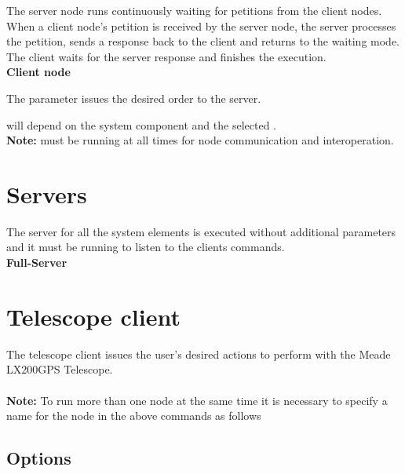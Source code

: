 \documentclass[a4paper,english]{article}
\begin{document}
The server node runs continuously waiting for petitions from the client nodes. When a client node's petition is received by the server node, the server processes the petition, sends a response back to the client and returns to the waiting mode. The client waits for the server response and finishes the execution. \\

\noindent
\textbf{Client node}

The  parameter issues the desired order to the server.

 will depend on the system component and the selected . \\

\noindent
\textbf{Note:}  must be running at all times for node communication and interoperation.


\section{Servers}

The server for all the system elements is executed without additional parameters and it must be running to listen to the clients commands. \\

\noindent
\textbf{Full-Server}

  


\section{Telescope client}

The telescope client issues the user's desired actions to perform with the Meade LX200GPS Telescope. \\

     \\

\textbf{Note:} To run more than one  node at the same time it is necessary to specify a name for the node in the above commands as follows 


\subsection{Options}
\end{document}

